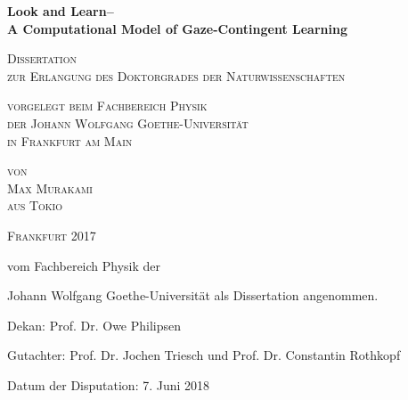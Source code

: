 \documentclass[a4paper]{scrreprt}
\begin{document}







\begin{titlepage}
\centering

{\huge \bfseries Look and Learn--\\A Computational Model of Gaze-Contingent Learning \par}
\vspace{3cm}
{\scshape \Large Dissertation\\zur Erlangung des Doktorgrades der Naturwissenschaften \par}
\vspace{2cm}
{\scshape \Large vorgelegt beim Fachbereich Physik\\der Johann Wolfgang Goethe-Universit\"at\\in Frankfurt am Main \par}
\vspace{2cm}
{\scshape \Large von\\Max Murakami\\aus Tokio \par}
\vspace{2cm}
{\scshape \Large Frankfurt 2017}
\vfill

\end{titlepage}

\vspace{6cm}
{vom Fachbereich Physik der \par}
\vspace{1cm}
{Johann Wolfgang Goethe-Universit\"at als Dissertation angenommen. \par}
\vspace{4cm}
{Dekan: Prof. Dr. Owe Philipsen \par}
\vspace{1cm}
{Gutachter: Prof. Dr. Jochen Triesch und Prof. Dr. Constantin Rothkopf \par}
\vspace{1cm}
{Datum der Disputation: 7. Juni 2018}
\vfill
\end{document}
